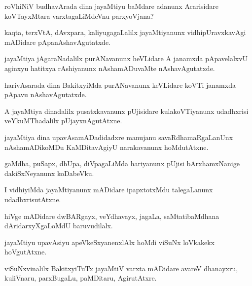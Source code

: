 \begin{mng}
roVhiNiV budhavArada dina jayaMtiyu baMdare adanunx Acarisidare koVTayxMtara varxtagaLiMdeVnu parxyoVjana?
\end{mng}

\begin{mng}
kaqta, terxVtA, dAvxpara, kaliyugagaLalilx jayaMtiyanunx vidhipUravxkavAgi mADidare pApanAshavAgutatxde.
\end{mng}

\begin{mng}
jayaMtiya jAgaraNadalilx purANavanunx heVLidare A janamxda pApavelalxvU aginxyu hatitxya rAshiyanunx nAshamADuvaMte nAshavAgutatxde.
\end{mng}

\begin{mng}
harivAsarada dina BakitxyiMda purANavanunx keVLidare koVTi janamxda pApavu nAshavAgutatxde.
\end{mng}

\begin{mng}
A jayaMtiya dinadalilx pusatxkavanunx pUjisidare kulakoVTiyanunx udadhxrisi veYkuMThadalilx pUjayxnAgutAtxne.
\end{mng}

\begin{mng}
jayaMtiya dina upavAsamADadidadxre manujanu savaRdhamaRgaLanUnx nAshamADikoMDu KaMDitavAgiyU narakavanunx hoMdutAtxne.
\end{mng}

\begin{mng}
gaMdha, puSapx, dhUpa, diVpagaLiMda hariyanunx pUjisi bArxhamxNanige dakiSxNeyanunx koDabeVku.
\end{mng}

\begin{mng}
I vidhiyiMda jayaMtiyanunx mADidare ipapxtotxMdu talegaLanunx udadhxrisutAtxne.
\end{mng}

\begin{mng}
hiVge mADidare dwBARgayx, veYdhavayx, jagaLa, saMtatibaMdhana dAridarxyXgaLoMdU baruvudilalx.
\end{mng}

\begin{mng}
jayaMtiyu upavAsiyu apeVkeSxyanenxlAlx hoMdi viSuNx loVkakekx hoVgutAtxne.
\end{mng}

\begin{mng}
viSuNxvinalilx BakitxyiTuTx jayaMtiV varxta mADidare avareV dhanayxru, kuliVnaru, parxBugaLu, paMDitaru, AgirutAtxre.
\end{mng}

